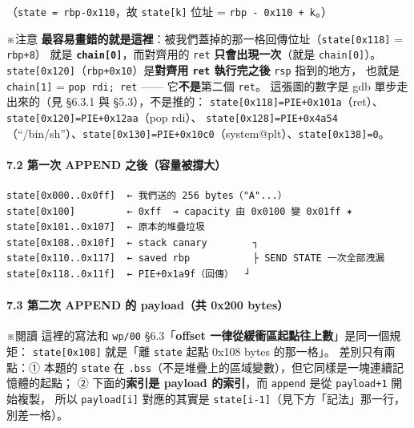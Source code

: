 \documentclass[10pt,a4paper]{article}
\renewenvironment{quote}{%
  \begin{mdframed}[linewidth=0pt,innerleftmargin=0pt,innerrightmargin=0pt,
    innerbottommargin=0pt,innertopmargin=0pt,skipabove=0.55em,skipbelow=0.55em,
    leftmargin=0.9em,rightmargin=0.4em,startcode={\color{quotebar}\vrule width 2.6pt},%
    endcode={}]%
  \itshape\color{black}%
}{%
  \end{mdframed}%
}
\begin{document}
（\texttt{state\ \allowbreak{}=\ \allowbreak{}rbp-\allowbreak{}0x110}，故 \texttt{state{[}k{]}} 位址 =
\texttt{rbp\ \allowbreak{}-\allowbreak{}\ \allowbreak{}0x110\ \allowbreak{}+\ \allowbreak{}k}。）

\begin{quote}
※注意
\textbf{最容易畫錯的就是這裡}：被我們蓋掉的那一格回傳位址（\texttt{state{[}0x118{]}}
= \texttt{rbp+8}） 就是 \textbf{\texttt{chain{[}0{]}}}，而對齊用的
\texttt{ret} \textbf{只會出現一次}（就是 \texttt{chain{[}0{]}}）。
\texttt{state{[}0x120{]}}（\texttt{rbp+0x10}）是\textbf{對齊用
\texttt{ret} 執行完之後} \texttt{rsp} 指到的地方， 也就是
\texttt{chain{[}1{]}} = \texttt{pop\ \allowbreak{}rdi;\ \allowbreak{}ret} ------
它\textbf{不是}第二個 \texttt{ret}。 這張圖的數字是 gdb 單步走出來的（見
§6.3.1 與 §5.3），不是推的：
\texttt{state{[}0x118{]}=PIE+0x101a}（ret）、\texttt{state{[}0x120{]}=PIE+0x12aa}（pop
rdi）、
\texttt{state{[}0x128{]}=PIE+0x4a54}（``/bin/sh''）、\texttt{state{[}0x130{]}=PIE+0x10c0}（system@plt）、\texttt{state{[}0x138{]}=0}。
\end{quote}

\paragraph{7.2 第一次 APPEND
之後（容量被撐大）}\label{ux7b2cux4e00ux6b21-append-ux4e4bux5f8cux5bb9ux91cfux88abux6490ux5927}

\begin{Verbatim}[breaklines=true,breakanywhere=true,breakautoindent=false,fontsize=\fontsize{7.0}{9.5}\selectfont]
state[0x000..0x0ff]  ← 我們送的 256 bytes（"A"...）
state[0x100]         ← 0xff  → capacity 由 0x0100 變 0x01ff ✶
state[0x101..0x107]  ← 原本的堆疊垃圾
state[0x108..0x10f]  ← stack canary        ┐
state[0x110..0x117]  ← saved rbp           ├ SEND STATE 一次全部洩漏
state[0x118..0x11f]  ← PIE+0x1a9f（回傳）  ┘
\end{Verbatim}

\paragraph{7.3 第二次 APPEND 的 payload（共 0x200
bytes）}\label{ux7b2cux4e8cux6b21-append-ux7684-payloadux5171-0x200-bytes}

\begin{quote}
※閱讀 這裡的寫法和 \texttt{wp/\allowbreak{}00} §6.3「\textbf{offset
一律從緩衝區起點往上數}」是同一個規矩： \texttt{state{[}0x108{]}}
就是「離 \texttt{state} 起點 0x108 bytes 的那一格」。 差別只有兩點：①
本題的 \texttt{state} 在
\texttt{.\allowbreak{}bss}（不是堆疊上的區域變數），但它同樣是一塊連續記憶體的起點；
② 下面的\textbf{索引是 payload 的索引}，而 \texttt{append} 是從
\texttt{payload+1} 開始複製， 所以 \texttt{payload{[}i{]}} 對應的其實是
\texttt{state{[}i-\allowbreak{}1{]}}（見下方「記法」那一行，別差一格）。
\end{quote}
\end{document}
